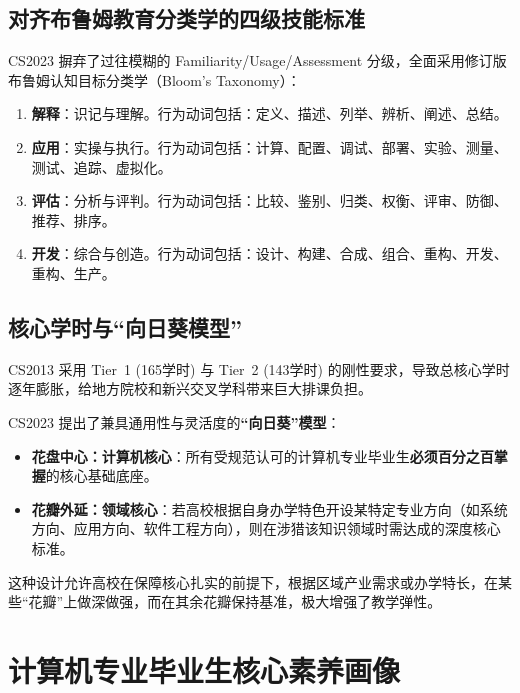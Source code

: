 \subsection{对齐布鲁姆教育分类学的四级技能标准}
CS2023 摒弃了过往模糊的 Familiarity/Usage/Assessment 分级，全面采用修订版布鲁姆认知目标分类学（Bloom's Taxonomy）：
\begin{enumerate}
    \item \textbf{解释}：识记与理解。行为动词包括：定义、描述、列举、辨析、阐述、总结。
    \item \textbf{应用}：实操与执行。行为动词包括：计算、配置、调试、部署、实验、测量、测试、追踪、虚拟化。
    \item \textbf{评估}：分析与评判。行为动词包括：比较、鉴别、归类、权衡、评审、防御、推荐、排序。
    \item \textbf{开发}：综合与创造。行为动词包括：设计、构建、合成、组合、重构、开发、重构、生产。
\end{enumerate}

\subsection{核心学时与“向日葵模型”}
CS2013 采用 Tier~1 (165学时) 与 Tier~2 (143学时) 的刚性要求，导致总核心学时逐年膨胀，给地方院校和新兴交叉学科带来巨大排课负担。

CS2023 提出了兼具通用性与灵活度的\textbf{“向日葵”模型}：
\begin{itemize}
    \item \textbf{花盘中心：计算机核心}：所有受规范认可的计算机专业毕业生\textbf{必须百分之百掌握}的核心基础底座。
    \item \textbf{花瓣外延：领域核心}：若高校根据自身办学特色开设某特定专业方向（如系统方向、应用方向、软件工程方向），则在涉猎该知识领域时需达成的深度核心标准。
\end{itemize}
这种设计允许高校在保障核心扎实的前提下，根据区域产业需求或办学特长，在某些“花瓣”上做深做强，而在其余花瓣保持基准，极大增强了教学弹性。

\section{计算机专业毕业生核心素养画像}

